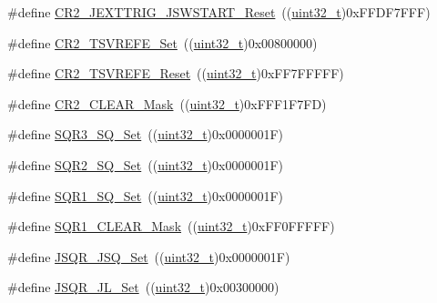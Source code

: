 \begin{DoxyCompactItemize}
\item 
\#define \hyperlink{group___a_d_c___private___defines_gaaa2fb01c1649fde61115602559942ee2}{C\+R2\+\_\+\+J\+E\+X\+T\+T\+R\+I\+G\+\_\+\+J\+S\+W\+S\+T\+A\+R\+T\+\_\+\+Reset}~((\hyperlink{_p_e___types_8h_a33594304e786b158f3fb30289278f5af}{uint32\+\_\+t})0x\+F\+F\+D\+F7\+F\+F\+F)
\item 
\#define \hyperlink{group___a_d_c___private___defines_ga7f5e0f807edebbfcef4883f3ec42b9e8}{C\+R2\+\_\+\+T\+S\+V\+R\+E\+F\+E\+\_\+\+Set}~((\hyperlink{_p_e___types_8h_a33594304e786b158f3fb30289278f5af}{uint32\+\_\+t})0x00800000)
\item 
\#define \hyperlink{group___a_d_c___private___defines_gaa207bc0eeed8b546dc9536b02df633b5}{C\+R2\+\_\+\+T\+S\+V\+R\+E\+F\+E\+\_\+\+Reset}~((\hyperlink{_p_e___types_8h_a33594304e786b158f3fb30289278f5af}{uint32\+\_\+t})0x\+F\+F7\+F\+F\+F\+F\+F)
\item 
\#define \hyperlink{group___a_d_c___private___defines_ga49192361afb92aee0e3f1124ef1131a0}{C\+R2\+\_\+\+C\+L\+E\+A\+R\+\_\+\+Mask}~((\hyperlink{_p_e___types_8h_a33594304e786b158f3fb30289278f5af}{uint32\+\_\+t})0x\+F\+F\+F1\+F7\+F\+D)
\item 
\#define \hyperlink{group___a_d_c___private___defines_ga8a04f115021dc5261562b4dc04c01109}{S\+Q\+R3\+\_\+\+S\+Q\+\_\+\+Set}~((\hyperlink{_p_e___types_8h_a33594304e786b158f3fb30289278f5af}{uint32\+\_\+t})0x0000001\+F)
\item 
\#define \hyperlink{group___a_d_c___private___defines_ga2329f779aee00e5990d6430a01de8cb0}{S\+Q\+R2\+\_\+\+S\+Q\+\_\+\+Set}~((\hyperlink{_p_e___types_8h_a33594304e786b158f3fb30289278f5af}{uint32\+\_\+t})0x0000001\+F)
\item 
\#define \hyperlink{group___a_d_c___private___defines_ga91fb5f63b765a543dfa419ea0219351b}{S\+Q\+R1\+\_\+\+S\+Q\+\_\+\+Set}~((\hyperlink{_p_e___types_8h_a33594304e786b158f3fb30289278f5af}{uint32\+\_\+t})0x0000001\+F)
\item 
\#define \hyperlink{group___a_d_c___private___defines_ga6e3e238f38d7ff17939cbd5417fc51cc}{S\+Q\+R1\+\_\+\+C\+L\+E\+A\+R\+\_\+\+Mask}~((\hyperlink{_p_e___types_8h_a33594304e786b158f3fb30289278f5af}{uint32\+\_\+t})0x\+F\+F0\+F\+F\+F\+F\+F)
\item 
\#define \hyperlink{group___a_d_c___private___defines_ga5d460390dbe3b400b5e0fdf1e94929f0}{J\+S\+Q\+R\+\_\+\+J\+S\+Q\+\_\+\+Set}~((\hyperlink{_p_e___types_8h_a33594304e786b158f3fb30289278f5af}{uint32\+\_\+t})0x0000001\+F)
\item 
\#define \hyperlink{group___a_d_c___private___defines_ga46af9e738702305be0127f6c15c4f7b0}{J\+S\+Q\+R\+\_\+\+J\+L\+\_\+\+Set}~((\hyperlink{_p_e___types_8h_a33594304e786b158f3fb30289278f5af}{uint32\+\_\+t})0x00300000)

\end{DoxyCompactItemize}
